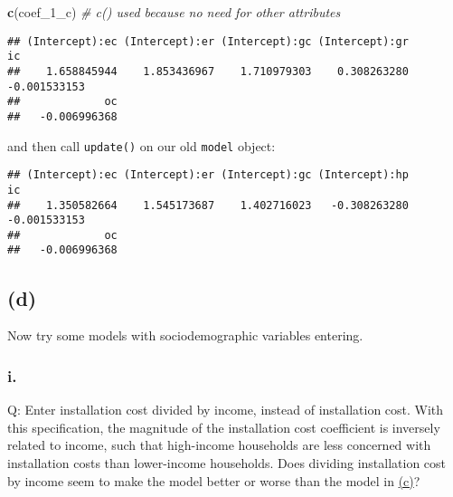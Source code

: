 \documentclass[
]{article}
\newenvironment{Shaded}{\begin{snugshade}}{\end{snugshade}}
\newcommand{\CommentTok}[1]{\textcolor[rgb]{0.56,0.35,0.01}{\textit{#1}}}
\newcommand{\DataTypeTok}[1]{\textcolor[rgb]{0.13,0.29,0.53}{#1}}
\newcommand{\DecValTok}[1]{\textcolor[rgb]{0.00,0.00,0.81}{#1}}
\newcommand{\KeywordTok}[1]{\textcolor[rgb]{0.13,0.29,0.53}{\textbf{#1}}}
\newcommand{\NormalTok}[1]{#1}
\newcommand{\OperatorTok}[1]{\textcolor[rgb]{0.81,0.36,0.00}{\textbf{#1}}}
\newcommand{\StringTok}[1]{\textcolor[rgb]{0.31,0.60,0.02}{#1}}
\begin{document}
\begin{Shaded}
\begin{Highlighting}[]
\KeywordTok{c}\NormalTok{(coef_}\DecValTok{1}\NormalTok{_c)}
\CommentTok{# c() used because no need for other attributes}
\end{Highlighting}
\end{Shaded}

\begin{verbatim}
## (Intercept):ec (Intercept):er (Intercept):gc (Intercept):gr             ic 
##    1.658845944    1.853436967    1.710979303    0.308263280   -0.001533153 
##             oc 
##   -0.006996368
\end{verbatim}

and then call \texttt{update()} on our old \texttt{model} object:

\begin{Shaded}
\end{Shaded}

\begin{verbatim}
## (Intercept):ec (Intercept):er (Intercept):gc (Intercept):hp             ic 
##    1.350582664    1.545173687    1.402716023   -0.308263280   -0.001533153 
##             oc 
##   -0.006996368
\end{verbatim}


\hypertarget{d}{%
\subsection{(d)}\label{d}}

Now try some models with sociodemographic variables entering.

\hypertarget{i.-2}{%
\subsubsection{i.}\label{i.-2}}

Q: Enter installation cost divided by income, instead of installation
cost. With this specification, the magnitude of the installation cost
coefficient is inversely related to income, such that high-income
households are less concerned with installation costs than lower-income
households. Does dividing installation cost by income seem to make the
model better or worse than the model in \protect\hyperlink{onec}{(c)}?
\end{document}
